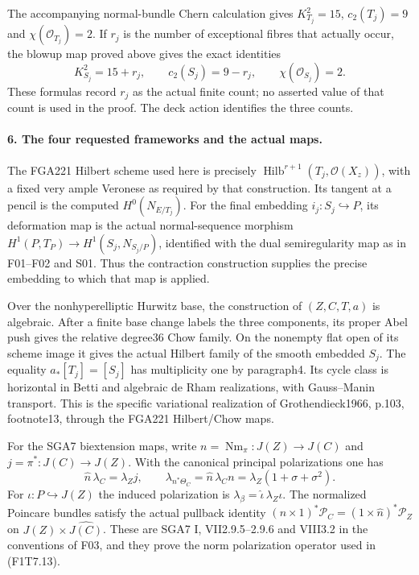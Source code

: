 The accompanying normal-bundle Chern calculation gives
$K_{T_j}^2=15$, $c_2(T_j)=9$ and
$\chi(\mathcal O_{T_j})=2$. If $r_j$ is the number of
exceptional fibres that actually occur, the blowup map
proved above gives the exact identities
\[
 K_{S_j}^2=15+r_j,\qquad c_2(S_j)=9-r_j,\qquad
                 \chi(\mathcal O_{S_j})=2.
 \tag{F1T7.15}
\]
These formulas record $r_j$ as the actual finite count;
no asserted value of that count is used in the proof.
The deck action identifies the three counts.

\paragraph{6. The four requested frameworks and the actual maps.}
The FGA221 Hilbert scheme used here is precisely
$\operatorname{Hilb}^{r+1}(T_j,\mathcal O(X_z))$, with a
fixed very ample Veronese as required by that construction.
Its tangent at a pencil is the computed $H^0(N_{E/T_j})$.
For the final embedding $i_j:S_j\hookrightarrow P$, its
deformation map is the actual normal-sequence morphism
$H^1(P,T_P)\to H^1(S_j,N_{S_j/P})$, identified with the
dual semiregularity map as in F01--F02 and S01.
Thus the contraction construction supplies the precise
embedding to which that map is applied.

Over the nonhyperelliptic Hurwitz base, the construction of
$(Z,C,T,a)$ is algebraic. After a finite base change labels
the three components, its proper Abel push gives the
relative degree36 Chow family. On the nonempty flat open
of its scheme image it gives the actual Hilbert family of
the smooth embedded $S_j$. The equality
$a_*[T_j]=[S_j]$ has multiplicity one by paragraph4.
Its cycle class is horizontal in Betti and algebraic de Rham
realizations, with Gauss--Manin transport. This is the
specific variational realization of Grothendieck1966,
p.103, footnote13, through the FGA221 Hilbert/Chow maps.

For the SGA7 biextension maps, write
$n=\operatorname{Nm}_\pi:J(Z)\to J(C)$ and
$j=\pi^*:J(C)\to J(Z)$.
With the canonical principal polarizations one has
\[
 \widehat n\,\lambda_C=\lambda_Zj,\qquad
 \lambda_{n^*\Theta_C}
       =\widehat n\,\lambda_C n
       =\lambda_Z(1+\sigma+\sigma^2).
 \tag{F1T7.16}
\]
For $\iota:P\hookrightarrow J(Z)$ the induced polarization
is $\lambda_\beta=\widehat\iota\,\lambda_Z\iota$.
The normalized Poincare bundles satisfy the actual
pullback identity
$(n\times1)^*\mathcal P_C=(1\times\widehat n)^*\mathcal P_Z$
on $J(Z)\times\widehat{J(C)}$.
These are SGA7 I, VII2.9.5--2.9.6 and VIII3.2 in
the conventions of F03, and they prove the norm
polarization operator used in (F1T7.13).

